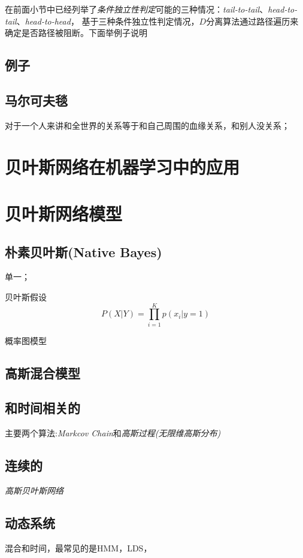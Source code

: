在前面小节中已经列举了\textsl{条件独立性判定}可能的三种情况：\textsl{tail-to-tail}、\textsl{head-to-tail}、\textsl{head-to-head}，
基于三种条件独立性判定情况，$D$分离算法通过路径遍历来确定是否路径被阻断。下面举例子说明

\subsection*{例子}

\subsection*{马尔可夫毯}

对于一个人来讲和全世界的关系等于和自己周围的血缘关系，和别人没关系；

\section{贝叶斯网络在机器学习中的应用}

\section{贝叶斯网络模型}

\subsection*{朴素贝叶斯(Native Bayes)}
单一；

贝叶斯假设
\begin{equation}
    P(X|Y)=\prod\limits_{i=1}^{K}p(x_i|y=1)
\end{equation}

概率图模型

\subsection*{高斯混合模型}

\subsection*{和时间相关的}

主要两个算法:\textsl{Markcov Chain}和\textsl{高斯过程(无限维高斯分布)}

\subsection*{连续的}

\textsl{高斯贝叶斯网络}

\subsection*{动态系统}

混合和时间，最常见的是HMM，LDS，

